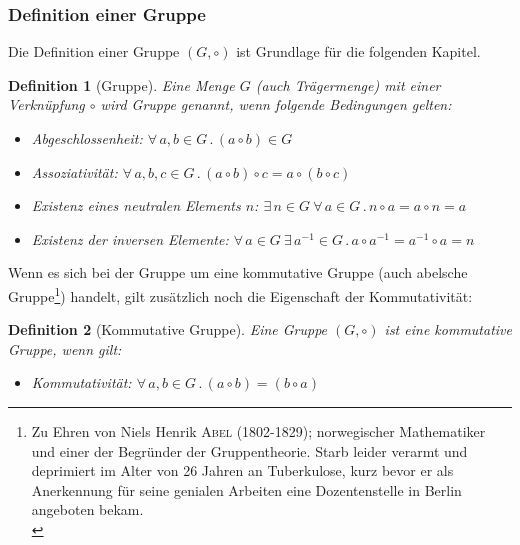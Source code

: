 \documentclass[12pt,a4paper, usenames, dvipsnames]{article}
\theoremstyle{mystyle}
\newtheorem{definition}{Definition}
\theoremstyle{definition}
\begin{document}
\subsubsection*{Definition einer Gruppe}

Die Definition einer Gruppe $(G, \circ)$ ist Grundlage für die folgenden Kapitel. 

\begin{definition}[Gruppe]
Eine Menge $G$ (auch Trägermenge) mit einer Verknüpfung $\circ$ wird Gruppe genannt, wenn folgende Bedingungen gelten: 
\vspace*{-0.5em}
\begin{itemize}
\item Abgeschlossenheit: $\forall \, a,b \in G \, . \, (a \circ b) \in G $
\item Assoziativität: $\forall \, a,b,c \in G \, . \, (a \circ b) \circ c = a \circ (b \circ c)$
\item Existenz eines neutralen Elements $n$: $\exists \, n \in G \ \forall \,  a \in G \, . \, n \circ a = a \circ n = a$ 
\item Existenz der inversen Elemente: $\forall \, a \in G \ \exists \, a^{-1} \in G \, . \, a \circ a^{-1} = a^{-1} \circ a = n$ 
\end{itemize}
\end{definition}

Wenn es sich bei der Gruppe um eine kommutative Gruppe (auch abelsche Gruppe\footnote{\glqq Zu Ehren von Niels Henrik \textsc{Abel} (1802-1829); norwegischer Mathematiker und einer der Begründer der Gruppentheorie. Starb leider verarmt und deprimiert im Alter von 26 Jahren an Tuberkulose, kurz bevor er als Anerkennung für seine genialen Arbeiten  eine Dozentenstelle in Berlin angeboten bekam.\grqq \\  \cite[S.21, Z.23]{Buch}}) handelt, gilt zusätzlich noch die Eigenschaft der Kommutativität: 

\begin{definition}[Kommutative Gruppe]
Eine Gruppe $(G, \circ)$ ist eine kommutative Gruppe, wenn gilt:
\vspace*{-0.5em}
\begin{itemize}
\item Kommutativität: $\forall \, a,b \in G \, . \, (a \circ b) = (b \circ a) $
\end{itemize}
\end{definition}
\vspace*{0.1cm}
\end{document}
